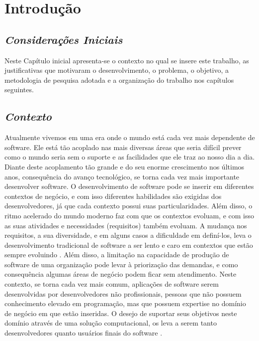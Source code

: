 \chapter[Introdução]{Introdução}

\section{\textit{Considerações Iniciais}}

Neste Capítulo inicial apresenta-se o contexto no qual se insere este trabalho, as
justificativas que motivaram o desenvolvimento, o problema, o objetivo, a
metodologia de pesquisa adotada e a organização do trabalho nos capítulos seguintes.

\section{\textit{Contexto}}

Atualmente vivemos em uma era onde o mundo está cada vez mais dependente de software. Ele está tão acoplado nas mais diversas áreas que seria difícil prever como o mundo seria sem o suporte e as facilidades que ele traz ao nosso dia a dia. Diante deste acoplamento tão grande e do seu enorme crescimento nos últimos anos, consequência do avanço tecnológico, se torna cada vez mais importante desenvolver software. O desenvolvimento de software pode se inserir em diferentes contextos de negócio, e com isso diferentes habilidades são exigidas dos desenvolvedores, já que cada contexto possui suas particularidades. Além disso, o ritmo acelerado do mundo moderno faz com que os contextos evoluam, e com isso as suas atividades e necessidades (requisitos) também evoluam. A mudança nos requisitos, a sua diversidade, e em alguns casos a dificuldade em definí-los, leva o desenvolvimento tradicional de software a ser lento e caro em contextos que estão sempre evoluindo \cite{lieberman2006}. Além disso, a limitação na capacidade de produção de software de uma organização pode levar à priorização das demandas, e como consequência algumas áreas de negócio podem ficar sem atendimento. Neste contexto, se torna cada vez mais comum, aplicações de software serem desenvolvidas por desenvolvedores não profissionais, pessoas que não possuem conhecimento elevado em programação, mas que possuem expertise no domínio de negócio em que estão inseridas. O desejo de suportar seus objetivos neste domínio através de uma solução computacional, os leva a serem tanto desenvolvedores quanto usuários finais do software \cite{lieberman2006}.

